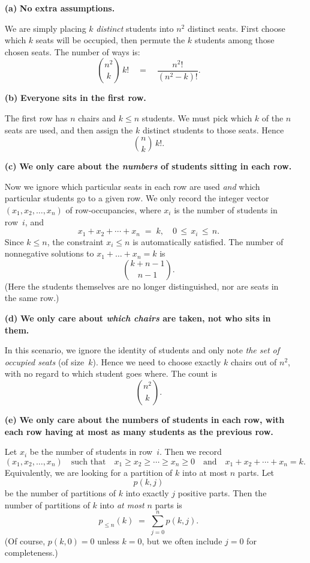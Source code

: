 \documentclass[docmute]{article}
\begin{document}
\begin{enumerate}
  \item[\textbf{(a)}]
    \textbf{No extra assumptions.}

    We are simply placing \(k\) \emph{distinct} students into \(n^2\) distinct seats. First choose which \(k\) seats will be occupied, then permute the \(k\) students among those chosen seats. The number of ways is:
    \[
      \binom{n^2}{k}\,k!
      \quad=\quad \frac{n^2!}{(n^2 - k)!}.
    \]

  \item[\textbf{(b)}]
    \textbf{Everyone sits in the first row.}

    The first row has \(n\) chairs and \(k \le n\) students. We must pick which \(k\) of the \(n\) seats are used, and then assign the \(k\) distinct students to those seats. Hence
    \[
      \binom{n}{k}\,k!.
    \]

  \item[\textbf{(c)}]
    \textbf{We only care about the \emph{numbers} of students sitting in each row.}

    Now we ignore which particular seats in each row are used \emph{and} which particular students go to a given row.  We only record the integer vector \((x_1, x_2,\dots, x_n)\) of row‐occupancies, where \(x_i\) is the number of students in row~\(i\), and
    \[
      x_1 + x_2 + \cdots + x_n \;=\; k,
      \quad 0 \,\le\, x_i \,\le\, n.
    \]
    Since \(k \le n\), the constraint \(x_i \le n\) is automatically satisfied.  The number of nonnegative solutions to \(x_1 + \dots + x_n = k\) is
    \[
      \binom{k + n - 1}{n - 1}.
    \]
    (Here the students themselves are no longer distinguished, nor are seats in the same row.)

  \item[\textbf{(d)}]
    \textbf{We only care about \emph{which chairs} are taken, not who sits in them.}

    In this scenario, we ignore the identity of students and only note \emph{the set of occupied seats} (of size~\(k\)).  Hence we need to choose exactly \(k\) chairs out of \(n^2\), with no regard to which student goes where.  The count is
    \[
      \binom{n^2}{k}.
    \]

    \item[\textbf{(e)}]
    \textbf{We only care about the numbers of students in each row, with each row having at most as many students as the previous row.}
    
    Let \(x_i\) be the number of students in row~\(i\). Then we record
    \[
      (x_1,x_2,\ldots,x_n)
      \quad\text{such that}\quad
      x_1 \ge x_2 \ge \cdots \ge x_n \ge 0
      \quad\text{and}\quad
      x_1 + x_2 + \cdots + x_n = k.
    \]
    Equivalently, we are looking for a partition of \(k\) into at most \(n\) parts. Let
    \[
      p(k,j)
    \]
    be the number of partitions of \(k\) into exactly \(j\) positive parts. Then the number of partitions of \(k\) into \emph{at most} \(n\) parts is
    \[
      p_{\le n}(k)
      \;=\;
      \sum_{j=0}^n p(k,j).
    \]
    (Of course, \(p(k,0)=0\) unless \(k=0\), but we often include \(j=0\) for completeness.)
    

\end{enumerate}
\end{document}
